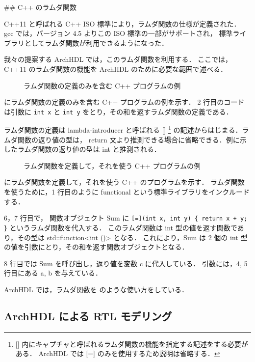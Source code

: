  \#\# C++ のラムダ関数

C++11 と呼ばれる C++ ISO 標準により，ラムダ関数の仕様が定義された． gcc
では，バージョン 4.5 よりこの ISO 標準の一部がサポートされ，
標準ライブラリとしてラムダ関数が利用できるようになった．

我々の提案する ArchHDL では，このラムダ関数を利用する． ここでは，C++11
のラムダ関数の機能を ArchHDL のために必要な範囲で述べる．

\begin{figure}[t]
 
 \caption{ラムダ関数の定義のみを含む C++ プログラムの例}
 \label{src:def_lambda}
\end{figure}

 にラムダ関数の定義のみを含む C++
プログラムの例を示す． 2 行目のコードは引数に \verb`int x` と
\verb`int y` をとり，その和を返すラムダ関数の定義である．

ラムダ関数の定義は lambda-introducer と呼ばれる {[}{]} \footnote{
[] 内にキャプチャと呼ばれるラムダ関数の機能を指定する記述をする必要がある．
ArchHDL では [=] のみを使用するため説明は省略する．
} の記述からはじまる．ラムダ関数の返り値の型は， return
文より推測できる場合に省略できる．例に示したラムダ関数の返り値の型は int
と推測される．

\begin{figure}[t]
 
 \caption{ラムダ関数を定義して，それを使う C++ プログラムの例}
 \label{src:ex_lambda}
\end{figure}

 にラムダ関数を定義して，それを使う C++
のプログラムを示す． ラムダ関数を使うために，1 行目のように functional
という標準ライブラリをインクルードする．

6，7 行目で， 関数オブジェクト Sum に
\verb`[=](int x, int y) { return x + y; }` というラムダ関数を代入する．
このラムダ関数は int 型の値を返す関数であり，その型は
std::function\textless{}int ()\textgreater{} となる． これにより，Sum は
2 個の int 型の値を引数にとり，その和を返す関数オブジェクトとなる．

8 行目では Sum を呼び出し，返り値を変数 c に代入している． 引数には，4,
5 行目にある a, b を与えている．

ArchHDL では，ラムダ関数を 
のような使い方をしている．

\fi

\subsection{ArchHDL による RTL モデリング \label{ss:modeling}}

